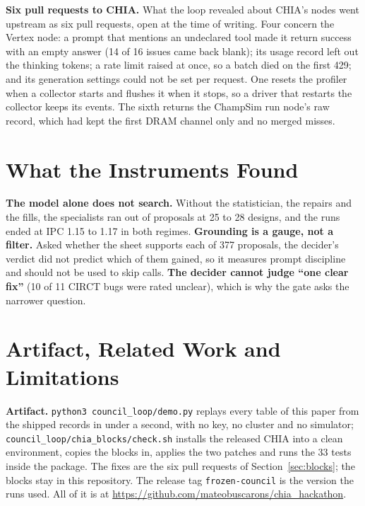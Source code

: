\documentclass[conference]{IEEEtran}
\begin{document}
\textbf{Six pull requests to CHIA.} What the loop revealed about CHIA's nodes went upstream as
six pull requests, open at the time of writing. Four concern the Vertex node: a prompt that
mentions an undeclared tool made it return success with an empty answer (14 of 16 issues came
back blank); its usage record left out the thinking tokens; a rate
limit raised at once, so a batch died on the first 429; and its generation settings could not be
set per request. One resets the profiler when a collector starts and flushes it when it stops,
so a driver that restarts the collector keeps its events. The sixth returns the ChampSim run
node's raw record, which had kept the first DRAM channel only and no merged misses. %

\section{What the Instruments Found}\label{sec:found}
\textbf{The model alone does not search.} Without the statistician, the repairs and the fills,
the specialists ran out of proposals at 25 to 28 designs, and the runs ended at IPC 1.15 to 1.17
in both regimes. %
\textbf{Grounding is a gauge, not a filter.} Asked whether the sheet supports each of 377
proposals, the decider's verdict did not predict which of them gained, so it measures prompt
discipline and should not be used to skip calls. %
\textbf{The decider cannot judge ``one clear fix''} (10 of 11 CIRCT bugs were rated unclear),
which is why the gate asks the narrower question. %

\section{Artifact, Related Work and Limitations}\label{sec:artifact}
\textbf{Artifact.} \texttt{python3 council\_loop/demo.py} replays every table of this paper from
the shipped records in under a second, with no key, no cluster and no simulator;
\texttt{council\_loop/chia\_blocks/check.sh} installs the released CHIA into a clean environment,
copies the blocks in, applies the two patches and runs the 33 tests inside the package. The fixes
are the six pull requests of Section~\ref{sec:blocks}; the blocks stay in this repository. The
release tag \texttt{frozen-council} is the version the runs used. All of it is at
\url{https://github.com/mateobuscarons/chia_hackathon}.
\end{document}
